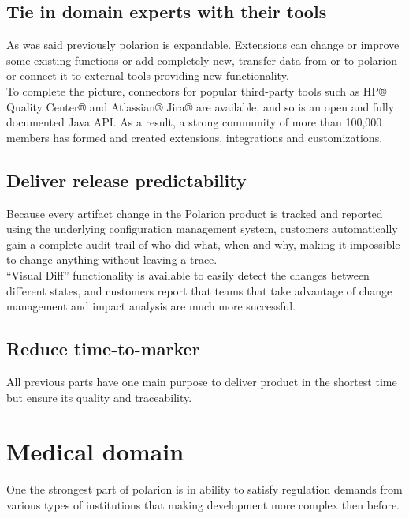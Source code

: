 \documentclass[thesis=M,english]{FITthesis}[2012/06/26]
\begin{document}
\subsection{Tie in domain experts with their tools}

As was said previously \acrshort{polarion} is expandable. Extensions can change or improve some existing functions or add completely new, transfer data from or to \acrshort{polarion} or connect it to external tools providing new functionality.\\

To complete the picture, connectors for popular third-party tools such as HP® Quality Center® and Atlassian® Jira® are available, and so is an open and fully documented Java API. As a result, a strong community of more than 100,000 members has formed and created extensions, integrations and customizations.

\subsection{Deliver release predictability}

Because every artifact change in the Polarion product is tracked and reported using the underlying configuration management system, customers automatically gain a complete audit trail of who did what, when and why, making it impossible to change anything without leaving a trace.\\

“Visual Diff” functionality is available to easily detect the changes between different states, and customers report that teams that take advantage of change management and impact analysis are much more successful.

\subsection{Reduce time-to-marker}

All previous parts have one main purpose to deliver product in the shortest time but ensure its quality and traceability.\\
 

\section{Medical domain}

One the strongest part of \acrshort{polarion} is in ability to satisfy regulation demands from various types of institutions that making development more complex then before. \\
\end{document}
